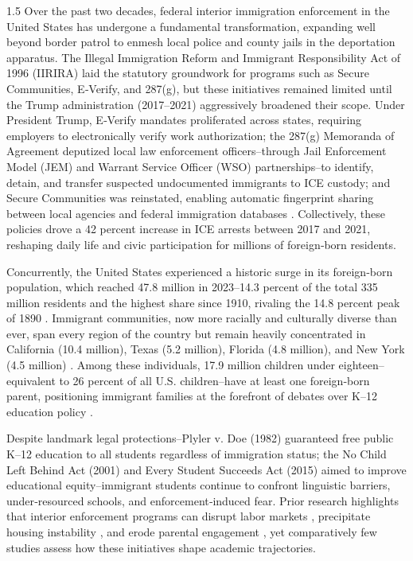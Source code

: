\documentclass[12pt]{article}
\begin{document}
\begin{spacing}{1.5}
\indent Over the past two decades, federal interior immigration enforcement in the United States has undergone a fundamental transformation, expanding well beyond border patrol to enmesh local police and county jails in the deportation apparatus. The Illegal Immigration Reform and Immigrant Responsibility Act of 1996 (IIRIRA) laid the statutory groundwork for programs such as Secure Communities, E‑Verify, and 287(g), but these initiatives remained limited until the Trump administration (2017–2021) aggressively broadened their scope. Under President Trump, E‑Verify mandates proliferated across states, requiring employers to electronically verify work authorization; the 287(g) Memoranda of Agreement deputized local law enforcement officers–through Jail Enforcement Model (JEM) and Warrant Service Officer (WSO) partnerships–to identify, detain, and transfer suspected undocumented immigrants to ICE custody; and Secure Communities was reinstated, enabling automatic fingerprint sharing between local agencies and federal immigration databases \citep{amuedo2015, dee2020}. Collectively, these policies drove a 42 percent increase in ICE arrests between 2017 and 2021, reshaping daily life and civic participation for millions of foreign‑born residents.

Concurrently, the United States experienced a historic surge in its foreign‑born population, which reached 47.8 million in 2023–14.3 percent of the total 335 million residents and the highest share since 1910, rivaling the 14.8 percent peak of 1890 \citep{moslimani2024}. Immigrant communities, now more racially and culturally diverse than ever, span every region of the country but remain heavily concentrated in California (10.4 million), Texas (5.2 million), Florida (4.8 million), and New York (4.5 million) \citep{moslimani2024}. Among these individuals, 17.9 million children under eighteen–equivalent to 26 percent of all U.S. children–have at least one foreign‑born parent, positioning immigrant families at the forefront of debates over K–12 education policy \citep{batalova2025}.

Despite landmark legal protections–Plyler v. Doe (1982) guaranteed free public K–12 education to all students regardless of immigration status; the No Child Left Behind Act (2001) and Every Student Succeeds Act (2015) aimed to improve educational equity–immigrant students continue to confront linguistic barriers, under‑resourced schools, and enforcement‑induced fear. Prior research highlights that interior enforcement programs can disrupt labor markets \citep{cordova_nodate}, precipitate housing instability \citep{rugh2016}, and erode parental engagement \citep{amuedo2015}, yet comparatively few studies assess how these initiatives shape academic trajectories.


\end{spacing}
\end{document}
